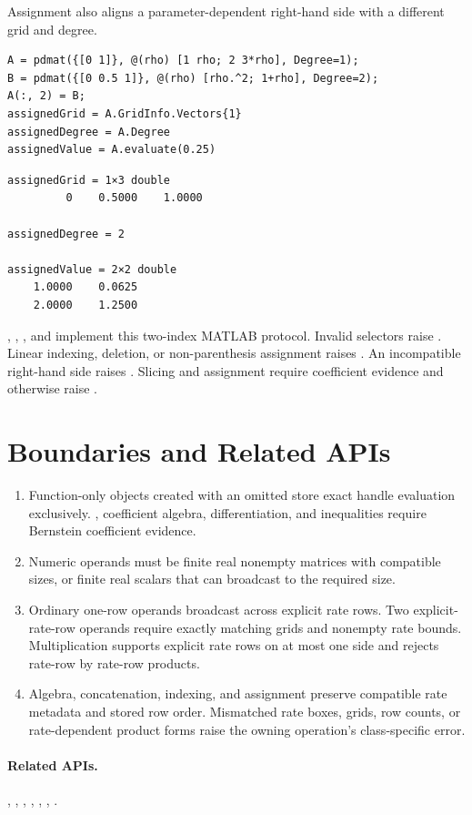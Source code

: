 Assignment also aligns a parameter-dependent right-hand side with a different grid and degree.

\begin{lstlisting}[style=dpmatlab]
A = pdmat({[0 1]}, @(rho) [1 rho; 2 3*rho], Degree=1);
B = pdmat({[0 0.5 1]}, @(rho) [rho.^2; 1+rho], Degree=2);
A(:, 2) = B;
assignedGrid = A.GridInfo.Vectors{1}
assignedDegree = A.Degree
assignedValue = A.evaluate(0.25)
\end{lstlisting}

\begin{lstlisting}[style=dpoutput]
assignedGrid = 1×3 double
         0    0.5000    1.0000

assignedDegree = 2

assignedValue = 2×2 double
    1.0000    0.0625
    2.0000    1.2500
\end{lstlisting}

, , , and  implement this two-index MATLAB protocol. Invalid selectors raise .  Linear indexing, deletion, or non-parenthesis assignment raises . An incompatible right-hand side raises .  Slicing and assignment require coefficient evidence and otherwise raise .
\section{Boundaries and Related APIs}
\label{sec:pdmat-limits}

\begin{enumerate}[leftmargin=*]
  \item Function-only objects created with an omitted  store exact handle evaluation exclusively. , coefficient algebra, differentiation, and inequalities require Bernstein coefficient evidence. \item Numeric operands must be finite real nonempty matrices with compatible sizes, or finite real scalars that can broadcast to the required size. \item Ordinary one-row operands broadcast across explicit rate rows. Two explicit-rate-row operands require exactly matching grids and nonempty rate bounds. Multiplication supports explicit rate rows on at most one side and rejects rate-row by rate-row products. \item Algebra, concatenation, indexing, and assignment preserve compatible rate metadata and stored row order. Mismatched rate boxes, grids, row counts, or rate-dependent product forms raise the owning operation's class-specific error.
\end{enumerate}

\paragraph{Related APIs.}
, , , , , , .
